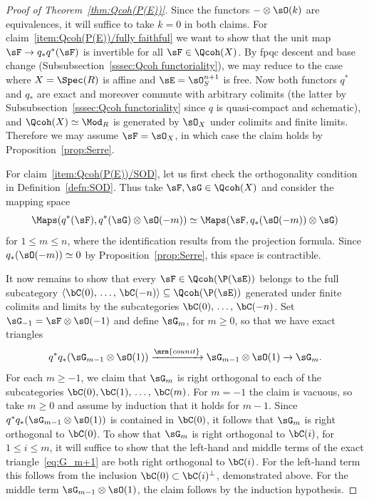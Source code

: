 \begin{proof}[Proof of Theorem~\ref{thm:Qcoh(P(E))}]
Since the functors $-\otimes\sO(k)$ are equivalences, it will suffice to take $k=0$ in both claims. For claim~\eqref{item:Qcoh(P(E))/fully faithful} we want to show that the unit map $\sF \to q_*q^*(\sF)$ is invertible for all $\sF \in \Qcoh(X)$. By fpqc descent and base change (Subsubsection~\ref{sssec:Qcoh functoriality}), we may reduce to the case where $X = \Spec(R)$ is affine and $\sE = \sO^{n+1}_S$ is free. Now both functors $q^*$ and $q_*$ are exact and moreover commute with arbitrary colimits (the latter by Subsubsection~\ref{sssec:Qcoh functoriality} since $q$ is quasi-compact and schematic), and $\Qcoh(X) \simeq \Mod_R$ is generated by $\sO_X$ under colimits and finite limits. Therefore we may assume $\sF = \sO_X$, in which case the claim holds by Proposition~\ref{prop:Serre}.

For claim~\eqref{item:Qcoh(P(E))/SOD}, let us first check the orthogonality condition in Definition~\ref{defn:SOD}. Thus take $\sF,\sG\in \Qcoh(X)$ and consider the mapping space
\[
\Maps(q^*(\sF), q^*(\sG) \otimes \sO(-m)) \simeq \Maps(\sF, q_*(\sO(-m)) \otimes \sG)
\]
for $1\le m\le n$, where the identification results from the projection formula. Since $q_*(\sO(-m)) \simeq 0$ by Proposition~\ref{prop:Serre}, this space is contractible.

It now remains to show that every $\sF \in \Qcoh(\P(\sE))$ belongs to the full subcategory $\langle \bC(0),\,\ldots,\,\bC(-n) \rangle \subseteq \Qcoh(\P(\sE))$ generated under finite colimits and limits by the subcategories $\bC(0),\,\ldots,\,\bC(-n)$. Set $\sG_{-1} = \sF \otimes \sO(-1)$ and define $\sG_m$, for $m\ge 0$, so that we have exact triangles
\begin{equation}\label{eq:G_m+1}
q^*q_*(\sG_{m-1} \otimes \sO(1)) \xrightarrow{\mrm{counit}} \sG_{m-1} \otimes \sO(1) \to \sG_{m}.
\end{equation}
For each $m\ge -1$, we claim that $\sG_m$ is right orthogonal to each of the subcategories $\bC(0),\bC(1),\,\ldots,\,\bC(m)$. For $m=-1$ the claim is vacuous, so take $m\ge 0$ and assume by induction that it holds for $m-1$. Since $q^*q_*(\sG_{m-1} \otimes \sO(1))$ is contained in $\bC(0)$, it follows that $\sG_{m}$ is right orthogonal to $\bC(0)$. To show that $\sG_m$ is right orthogonal to $\bC(i)$, for $1\le i\le m$, it will suffice to show that the left-hand and middle terms of the exact triangle~\eqref{eq:G_m+1} are both right orthogonal to $\bC(i)$. For the left-hand term this follows from the inclusion $\bC(0) \subset \bC(i)^\perp$, demonstrated above. For the middle term $\sG_{m-1} \otimes \sO(1)$, the claim follows by the induction hypothesis.


\end{proof}
